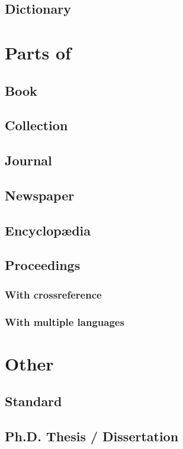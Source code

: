 \documentclass[a4paper]{article}
\begin{document}
\subsection{Dictionary}
\section{Parts of}
\subsection{Book}
\subsection{Collection}
\subsection{Journal}
\subsection{Newspaper}
\subsection{Encyclop\ae dia}
\subsection{Proceedings}
\subsubsection{With crossreference}
\subsubsection{With multiple languages}
\section{Other}
\subsection{Standard}
\subsection{Ph.D. Thesis / Dissertation}
\end{document}
